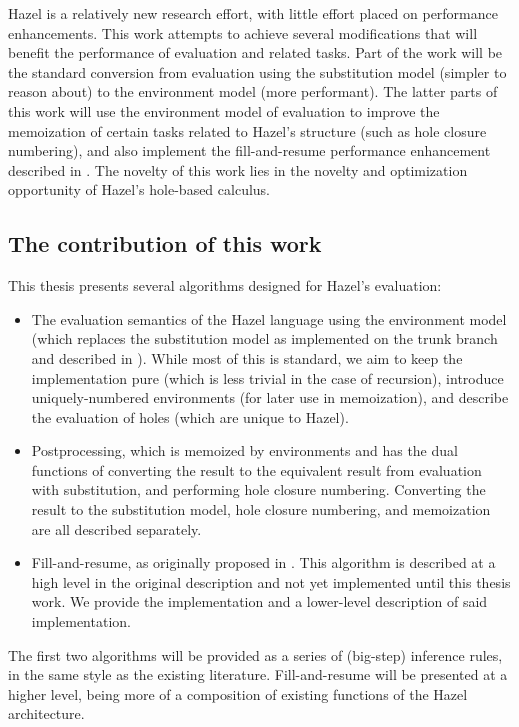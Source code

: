 Hazel is a relatively new research effort, with little effort placed on performance enhancements. This work attempts to achieve several modifications that will benefit the performance of evaluation and related tasks. Part of the work will be the standard conversion from evaluation using the substitution model (simpler to reason about) to the environment model (more performant). The latter parts of this work will use the environment model of evaluation to improve the memoization of certain tasks related to Hazel's structure (such as hole closure numbering), and also implement the fill-and-resume performance enhancement described in \cite{conf/popl/HazelnutLive19}. The novelty of this work lies in the novelty and optimization opportunity of Hazel's hole-based calculus.

\subsection{The contribution of this work}
\label{sec:contribution}

This thesis presents several algorithms designed for Hazel's evaluation:
\begin{itemize}
\item The evaluation semantics of the Hazel language using the environment model (which replaces the substitution model as implemented on the trunk branch and described in \cite{conf/popl/HazelnutLive19}). While most of this is standard, we aim to keep the implementation pure (which is less trivial in the case of recursion), introduce uniquely-numbered environments (for later use in memoization), and describe the evaluation of holes (which are unique to Hazel).
\item Postprocessing, which is memoized by environments and has the dual functions of converting the result to the equivalent result from evaluation with substitution, and performing hole closure numbering. Converting the result to the substitution model, hole closure numbering, and memoization are all described separately.
\item Fill-and-resume, as originally proposed in \cite{conf/popl/HazelnutLive19}. This algorithm is described at a high level in the original description and not yet implemented until this thesis work. We provide the implementation and a lower-level description of said implementation.
\end{itemize}
The first two algorithms will be provided as a series of (big-step) inference rules, in the same style as the existing literature. Fill-and-resume will be presented at a higher level, being more of a composition of existing functions of the Hazel architecture.

